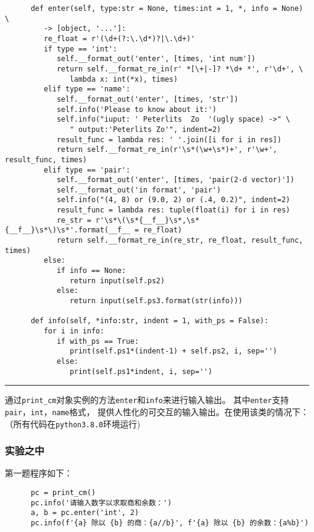 \documentclass[a4paper]{ctexart}
\newcommand{\lineiin}{
   \begin{center}
      \rule{\textwidth}{0.1pt}
   \end{center}
}
\begin{document}
\begin{verbatim}
      def enter(self, type:str = None, times:int = 1, *, info = None) \
         -> [object, '...']:
         re_float = r'(\d+(?:\.\d*)?|\.\d+)'
         if type == 'int':
            self.__format_out('enter', [times, 'int num'])
            return self.__format_re_in(r' *[\+|-]? *\d+ *', r'\d+', \
               lambda x: int(*x), times)
         elif type == 'name':
            self.__format_out('enter', [times, 'str'])
            self.info('Please to know about it:')
            self.info("iuput: ' Peterlits  Zo  '(ugly space) ->" \
               " output:'Peterlits Zo'", indent=2)
            result_func = lambda res: ' '.join([i for i in res])
            return self.__format_re_in(r'\s*(\w+\s*)+', r'\w+', result_func, times)
         elif type == 'pair':
            self.__format_out('enter', [times, 'pair(2-d vector)'])
            self.__format_out('in format', 'pair')
            self.info("(4, 8) or (9.0, 2) or (.4, 0.2)", indent=2)
            result_func = lambda res: tuple(float(i) for i in res)
            re_str = r'\s*\(\s*{__f__}\s*,\s*{__f__}\s*\)\s*'.format(__f__ = re_float)
            return self.__format_re_in(re_str, re_float, result_func, times)
         else:
            if info == None:
               return input(self.ps2)
            else:
               return input(self.ps3.format(str(info)))
   
      def info(self, *info:str, indent = 1, with_ps = False):
         for i in info:
            if with_ps == True:
               print(self.ps1*(indent-1) + self.ps2, i, sep='')
            else:
               print(self.ps1*indent, i, sep='')
      \end{verbatim}
      \lineiin
         通过\verb|print_cm|对象实例的方法\verb|enter|和\verb|info|来进行输入输出。%
         其中\verb|enter|支持\verb|pair|，\verb|int|，\verb|name|格式，%
         提供人性化的可交互的输入输出。在使用该类的情况下：%
         （所有代码在\verb|python3.8.0|环境运行)

         \subsubsection{实验之中}
         第一题程序如下：
      \begin{verbatim}
      pc = print_cm()
      pc.info('请输入数字以求取商和余数：')
      a, b = pc.enter('int', 2)
      pc.info(f'{a} 除以 {b} 的商：{a//b}', f'{a} 除以 {b} 的余数：{a%b}')
      \end{verbatim}
\end{document}
